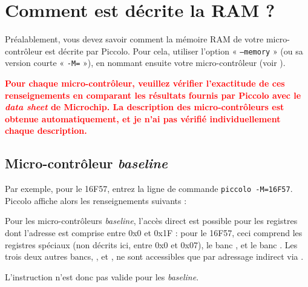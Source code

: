 
\cleardoublepage


\thispagestyle{empty}








\section{Comment est décrite la RAM ?}

Préalablement, vous devez savoir comment la mémoire RAM de votre micro-contrôleur est décrite par Piccolo. Pour cela, utiliser l'option « \texttt{--memory} » (ou sa version courte « \texttt{-M=} »), en nommant ensuite votre micro-contrôleur (voir ).

\textcolor{red}{\bf Pour chaque micro-contrôleur, veuillez vérifier l'exactitude de ces renseignements en comparant les résultats fournis par Piccolo avec le \emph{data sheet} de Microchip. La description des micro-contrôleurs est obtenue automatiquement, et je n'ai pas vérifié individuellement chaque description.}



\subsection{Micro-contrôleur \emph{baseline}}

Par exemple, pour le 16F57, entrez la ligne de commande \texttt{piccolo -M=16F57}. Piccolo affiche alors les renseignements suivants :



Pour les micro-contrôleurs \emph{baseline}, l'accès direct est possible pour les registres dont l'adresse est comprise entre 0x0 et 0x1F : pour le 16F57, ceci comprend les registres spéciaux (non décrits ici, entre 0x0 et 0x07), le banc , et le banc . Les trois deux autres bancs, ,  et , ne sont accessibles que par adressage indirect via .

L'instruction  n'est donc pas valide pour les \emph{baseline}.

